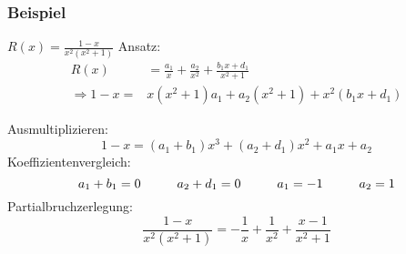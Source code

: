 \subsubsection{Beispiel}
$R(x)=\frac{1-x}{x^2(x^2+1)}$
Ansatz:
\begin{align*}
R(x)&=\frac{a_1}{x}+\frac{a_2}{x^2}+\frac{b_1x+d_1}{x^2+1}\\
\Rightarrow 1-x= &x(x^2+1)a_1+a_2(x^2+1)+x^2(b_1x+d_1)
\end{align*}

Ausmultiplizieren:
\[1-x=(a_1+b_1)x^3+(a_2+d_1)x^2+a_1x+a_2\]
Koeffizientenvergleich:
\[a_1+b_1=0\text{\hspace{10mm}}a_2+d_1=0\text{\hspace{10mm}}a_1=-1\text{\hspace{10mm}}a_2=1\]
Partialbruchzerlegung:
\[\frac{1-x}{x^2(x^2+1)}=-\frac{1}{x}+\frac{1}{x^2}+\frac{x-1}{x^2+1}\]
